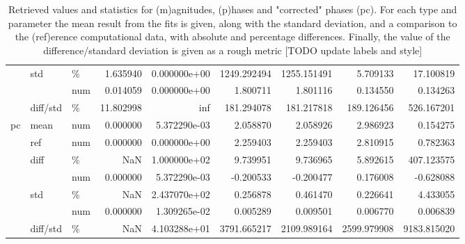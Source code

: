 \begin{table}
\begin{tabular}{lllrrrrrr}
   & std & \% &           1.635940 &       0.000000e+00 &        1249.292494 &        1255.151491 &          5.709133 &         17.100819 \\
   &          & num &           0.014059 &       0.000000e+00 &           1.800711 &           1.801116 &          0.134550 &          0.134263 \\
   & diff/std & \% &          11.802998 &                inf &         181.294078 &         181.217818 &        189.126456 &        526.167201 \\
pc & mean & num &           0.000000 &       5.372290e-03 &           2.058870 &           2.058926 &          2.986923 &          0.154275 \\
   & ref & num &           0.000000 &       0.000000e+00 &           2.259403 &           2.259403 &          2.810915 &          0.782363 \\
   & diff & \% &                NaN &       1.000000e+02 &           9.739951 &           9.736965 &          5.892615 &        407.123575 \\
   &          & num &           0.000000 &       5.372290e-03 &          -0.200533 &          -0.200477 &          0.176008 &         -0.628088 \\
   & std & \% &                NaN &       2.437070e+02 &           0.256878 &           0.461470 &          0.226641 &          4.433055 \\
   &          & num &           0.000000 &       1.309265e-02 &           0.005289 &           0.009501 &          0.006770 &          0.006839 \\
   & diff/std & \% &                NaN &       4.103288e+01 &        3791.665217 &        2109.989164 &       2599.979908 &       9183.815020 \\
\bottomrule
\end{tabular}

\caption{\label{tab:matE}Retrieved values and statistics for (m)agnitudes, (p)hases and "corrected" phases (pc). For each type and parameter the mean result from the fits is given, along with the standard deviation, and a comparison to the (ref)erence computational data, with absolute and percentage differences. Finally, the value of the difference/standard deviation is given as a rough metric  [TODO update labels and style]}
\end{table}